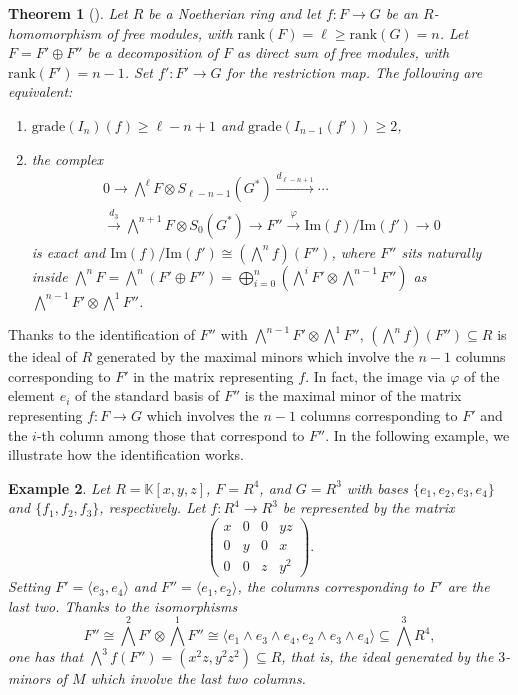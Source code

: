 \documentclass[utf8,latin1]{article}
\newtheorem{theorem}{Theorem}
\newtheorem{example}[theorem]{Example}
\newcommand{\KK}{\mathbb{K}}
\begin{document}
\begin{theorem}[{\cite[Theorem]{AS81}}]\label{thm:free:res}
Let $R$ be a Noetherian ring and let $f:F\rightarrow G$ be an $R$-homomorphism  of free modules, with $\mathrm{rank}(F)=\ell \geq \mathrm{rank}(G)=n$. Let $F=F' \oplus F''$ be a decomposition of $F$ as direct sum of free modules, with $\mathrm{rank}(F')=n-1$. Set $f':F'\rightarrow G$ for the restriction map. The following are equivalent:
\begin{enumerate}
\item[$(i)$] $\mathrm{grade}(I_n)(f)\geq \ell-n+1$ and $\mathrm{grade}(I_{n-1}(f'))\geq 2$,
\item[$(ii)$] the complex 
\begin{multline} \label{compl:G}
0 \rightarrow \bigwedge^\ell F \otimes S_{\ell-n-1}(G^{*}) \xrightarrow{d_{\ell-n+1}} \cdots \\ \xrightarrow{d_3} \bigwedge^{n+1} F \otimes S_{0}(G^{*}) \rightarrow F'' \xrightarrow{\varphi} \mathrm{Im}(f)/\mathrm{Im}(f') \rightarrow 0 
\end{multline}
is exact and $\mathrm{Im}(f)/\mathrm{Im}(f') \cong (\bigwedge^n f)(F'')$, where $F''$ sits naturally inside $\bigwedge^n F = \bigwedge^n (F' \oplus F'')=\bigoplus_{i=0}^n (\bigwedge^i F' \otimes \bigwedge^{n-1} F'')$ as $\bigwedge^{n-1} F' \otimes \bigwedge^1 F''$.
\end{enumerate}
\end{theorem}

Thanks to the identification of $F''$ with $\bigwedge^{n-1} F' \otimes \bigwedge^1 F''$,  $(\bigwedge^n f)(F'') \subseteq R$ is the ideal of $R$ generated by the maximal minors which involve the $n-1$ columns corresponding to $F'$ in the matrix representing $f$. In fact, the image via $\varphi$ of the element $e_i$ of the standard basis of $F''$ is the maximal minor of the matrix representing $f:F \rightarrow G$ which involves the $n-1$ columns corresponding to $F'$ and the $i$-th column among those that correspond to $F''$. In the following example, we illustrate how the identification works.

\begin{example}
Let $R=\KK[x,y,z]$, $F=R^4$, and $G=R^3$ with bases $\{e_1,e_2,e_3,e_4\}$ and $\{f_1,f_2,f_3\}$, respectively. Let $f: R^4 \rightarrow R^3$ be represented by the matrix 
\begin{equation*}
\begin{pmatrix}
x & 0 & 0 & yz \\
0 & y & 0 & x \\
0 & 0 & z & y^2
\end{pmatrix}.
\end{equation*}
Setting $F'=\langle e_3, e_4 \rangle$ and $F''=\langle e_1, e_2 \rangle$, the columns corresponding to $F'$ are the last two. Thanks to the isomorphisms $$F'' \cong \bigwedge^2 F' \otimes \bigwedge^1 F'' \cong \langle e_1 \wedge e_3 \wedge e_4 , e_2 \wedge e_3 \wedge e_4 \rangle \subseteq \bigwedge^3 R^4,$$ one has that  $\bigwedge^3f (F'') = (x^2 z, y^2z^2)\subseteq R$, that is, the ideal generated by the $3$-minors of $M$ which involve the last two columns.
\end{example} 
\end{document}
